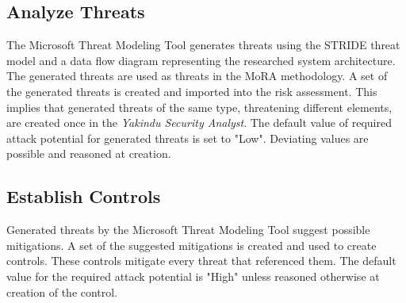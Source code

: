 \subsection{Analyze Threats}
\label{alteredanathreats}
The Microsoft Threat Modeling Tool generates threats using the STRIDE threat model and a data flow diagram representing the researched system architecture. The generated threats are used as threats in the MoRA methodology. A set of the generated threats is created and imported into the risk assessment. This implies that generated threats of the same type, threatening different elements, are created once in the \textit{Yakindu Security Analyst}. The default value of required attack potential for generated threats is set to "Low". Deviating values are possible and reasoned at creation.

\subsection{Establish Controls}
\label{alteredestacontrols}
Generated threats by the Microsoft Threat Modeling Tool suggest possible mitigations. A set of the suggested mitigations is created and used to create controls. These controls mitigate every threat that referenced them. The default value for the required attack potential is "High" unless reasoned otherwise at creation of the control.




